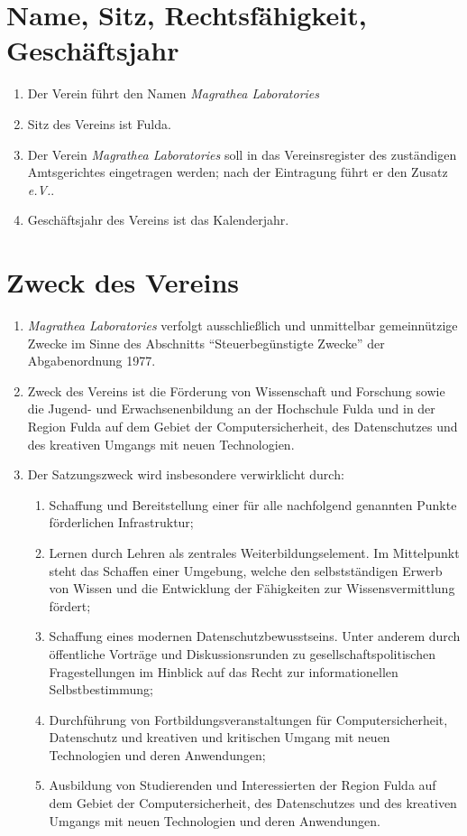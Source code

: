 \documentclass[ngerman]{article}
\begin{document}
\section{Name, Sitz, Rechtsfähigkeit, Geschäftsjahr}
\begin{enumerate}
\item Der Verein führt den Namen \emph{Magrathea Laboratories}
\item Sitz des Vereins ist Fulda.
\item Der Verein \emph{Magrathea Laboratories} soll in das Vereinsregister des zuständigen Amtsgerichtes eingetragen werden; nach der Eintragung führt er den
Zusatz \emph{e.V.}.
\item Geschäftsjahr des Vereins ist das Kalenderjahr.
\end{enumerate}

\section{Zweck des Vereins}
\begin{enumerate}
\item \emph{Magrathea Laboratories} verfolgt ausschließlich und unmittelbar gemeinnützige Zwecke im Sinne des Abschnitts ``Steuerbegünstigte Zwecke'' der Abgabenordnung 1977. 
\item Zweck des Vereins ist die Förderung von Wissenschaft und Forschung sowie die Jugend- und Erwachsenenbildung an der Hochschule Fulda und in der Region Fulda auf dem Gebiet der Computersicherheit, des Datenschutzes und des kreativen Umgangs mit neuen Technologien.
\item Der Satzungszweck wird insbesondere verwirklicht durch:
\begin{enumerate}
\item Schaffung und Bereitstellung einer für alle nachfolgend genannten Punkte förderlichen Infrastruktur;
\item Lernen durch Lehren als zentrales Weiterbildungselement. Im Mittelpunkt steht das Schaffen einer Umgebung, welche den selbstständigen Erwerb von Wissen und die Entwicklung der Fähigkeiten zur Wissensvermittlung fördert;
\item Schaffung eines modernen Datenschutzbewusstseins. Unter anderem durch öffentliche Vorträge und Diskussionsrunden zu gesellschaftspolitischen Fragestellungen im Hinblick auf das Recht zur informationellen Selbstbestimmung;
\item Durchführung von Fortbildungsveranstaltungen für Computersicherheit, Datenschutz und kreativen und kritischen Umgang mit neuen Technologien und deren
Anwendungen;
\item Ausbildung von Studierenden und Interessierten der Region Fulda auf dem Gebiet der Computersicherheit, des Datenschutzes und des kreativen Umgangs mit neuen Technologien und deren Anwendungen.
\end{enumerate}
\end{enumerate}
\end{document}
